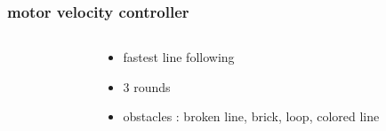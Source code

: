 \documentclass{beamer}
\begin{document}
\begin{frame}
  
  \frametitle{\bf motor velocity controller}
  
  \begin{columns}

    \begin{column}{0.5\textwidth}
    \end{column}

    \begin{column}{0.5\textwidth}
      \begin{itemize}
        \item fastest line following
        \item 3 rounds
        \item obstacles : broken line, brick, loop, colored line
      \end{itemize}
    \end{column}

  \end{columns}
  
\end{frame}
\end{document}
